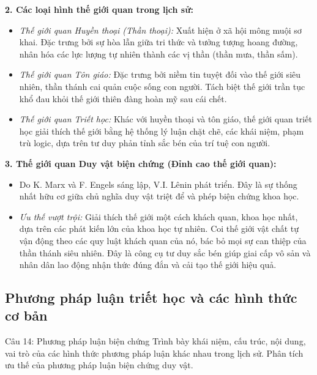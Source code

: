 \documentclass[12pt,a4paper]{article}
\begin{document}
{\noindent
\textbf{2. Các loại hình thế giới quan trong lịch sử:}
\begin{itemize}
    \item \textit{Thế giới quan Huyền thoại (Thần thoại):} Xuất hiện ở xã hội mông muội sơ khai. Đặc trưng bởi sự hòa lẫn giữa tri thức và tưởng tượng hoang đường, nhân hóa các lực lượng tự nhiên thành các vị thần (thần mưa, thần sấm).
    \item \textit{Thế giới quan Tôn giáo:} Đặc trưng bởi niềm tin tuyệt đối vào thế giới siêu nhiên, thần thánh cai quản cuộc sống con người. Tách biệt thế giới trần tục khổ đau khỏi thế giới thiên đàng hoàn mỹ sau cái chết.
    \item \textit{Thế giới quan Triết học:} Khác với huyền thoại và tôn giáo, thế giới quan triết học giải thích thế giới bằng hệ thống lý luận chặt chẽ, các khái niệm, phạm trù logic, dựa trên tư duy phản tỉnh sắc bén của trí tuệ con người.
\end{itemize}

\noindent
\textbf{3. Thế giới quan Duy vật biện chứng (Đỉnh cao thế giới quan):}
\begin{itemize}
    \item Do K. Marx và F. Engels sáng lập, V.I. Lênin phát triển. Đây là sự thống nhất hữu cơ giữa chủ nghĩa duy vật triệt để và phép biện chứng khoa học.
    \item \textit{Ưu thế vượt trội:} Giải thích thế giới một cách khách quan, khoa học nhất, dựa trên các phát kiến lớn của khoa học tự nhiên. Coi thế giới vật chất tự vận động theo các quy luật khách quan của nó, bác bỏ mọi sự can thiệp của thần thánh siêu nhiên. Đây là công cụ tư duy sắc bén giúp giai cấp vô sản và nhân dân lao động nhận thức đúng đắn và cải tạo thế giới hiệu quả.
\end{itemize}

\subsection{Phương pháp luận triết học và các hình thức cơ bản}

\begin{questionbox}{Câu 14: Phương pháp luận biện chứng}
Trình bày khái niệm, cấu trúc, nội dung, vai trò của các hình thức phương pháp luận khác nhau trong lịch sử. Phân tích ưu thế của phương pháp luận biện chứng duy vật.
\end{questionbox}

}
\end{document}
